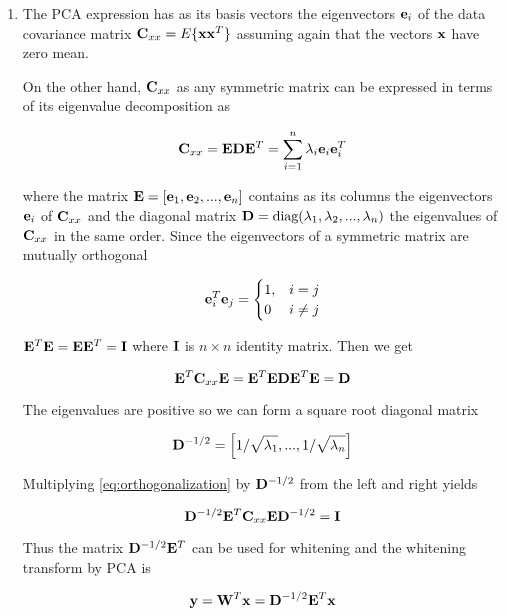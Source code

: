 \begin{enumerate}
\begin{solution}
\begin{enumerate}
    \item The PCA expression has as its basis vectors the eigenvectors
      $\mathbf{e}_i$ of the data covariance matrix
      $\mathbf{C}_{xx}=E\lbrace \mathbf{x}\mathbf{x}^T\rbrace$ assuming
      again that the vectors $\mathbf{x}$ have zero mean.

      On the other hand, $\mathbf{C}_{xx}$ as any symmetric matrix can be expressed
      in terms of its eigenvalue decomposition as

      \[
      \mathbf{C}_{xx} = \mathbf{E}\mathbf{D}\mathbf{E}^T = \sum_{i=1}^{n} \lambda_i \mathbf{e}_i \mathbf{e}_i^T
      \]

      where the matrix $\mathbf{E}=\left[ \mathbf{e}_1, \mathbf{e}_2, ...,
        \mathbf{e}_n \right]$ contains as its columns the
      eigenvectors $\mathbf{e}_i$ of $\mathbf{C}_{xx}$ and the diagonal matrix $\mathbf{D}=\text{diag}(\lambda_1,
      \lambda_2, ..., \lambda_n)$ the eigenvalues of $\mathbf{C}_{xx}$ in the same
      order. Since the eigenvectors of a symmetric matrix are mutually
      orthogonal

      \[
      \mathbf{e}_i^T\mathbf{e}_j = \begin{cases}1, &i=j\\0 &i\neq
        j\end{cases}
      \]


      $\mathbf{E}^T\mathbf{E} = \mathbf{E}\mathbf{E}^T = \mathbf{I}$ where
      $\mathbf{I}$ is $n\times n$ identity matrix. Then we get

      \begin{equation}
        \mathbf{E}^T\mathbf{C}_{xx}\mathbf{E} =
        \mathbf{E}^T\mathbf{E}\mathbf{D}\mathbf{E}^T\mathbf{E} = \mathbf{D}
        \label{eq:orthogonalization}
      \end{equation}
      
      The eigenvalues are positive so we can form a square root diagonal matrix

      \[
      \mathbf{D}^{-1/2} = \left[ 1/\sqrt{\lambda_1}, ..., 1/\sqrt{\lambda_n} \right]
      \]

      Multiplying \eqref{eq:orthogonalization} by $\mathbf{D}^{-1/2}$
      from the left and right yields

      \[
      \mathbf{D}^{-1/2}\mathbf{E}^T\mathbf{C}_{xx}\mathbf{E}\mathbf{D}^{-1/2}=\mathbf{I}
      \]

      Thus the matrix $\mathbf{D}^{-1/2}\mathbf{E}^T$ can be used for whitening
      and the whitening transform by PCA is

      \[
      \textbf{y}=\mathbf{W}^T\mathbf{x} = \mathbf{D}^{-1/2}\mathbf{E}^T\mathbf{x}
      \]


\end{enumerate}
\end{solution}
\end{enumerate}
